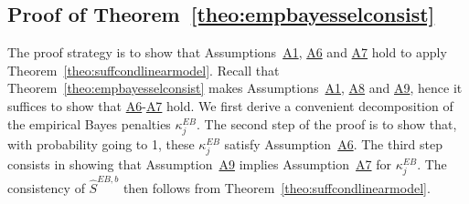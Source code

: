 \documentclass[bj,authoryear]{imsart}
\theoremstyle{plain}
\begin{document}
\subsection{Proof of Theorem~\ref{theo:empbayesselconsist}} The proof strategy is to show that Assumptions~\hyperlink{lab:A1}{A1}, \hyperlink{lab:A6}{A6} and \hyperlink{lab:A7}{A7} hold to apply Theorem~\ref{theo:suffcondlinearmodel}. Recall that Theorem~\ref{theo:empbayesselconsist} makes Assumptions~\hyperlink{lab:A1}{A1}, \hyperlink{lab:A8}{A8} and \hyperlink{lab:A9}{A9}, hence it suffices to show that \hyperlink{lab:A6}{A6}-\hyperlink{lab:A7}{A7} hold.
We first derive a convenient decomposition of the empirical Bayes penalties $\kappa^{EB}_j$. The second step of the proof is to show that, with probability going to 1, these $\kappa^{EB}_j$ satisfy Assumption~\hyperlink{lab:A6}{A6}. The third step consists in showing that Assumption~\hyperlink{lab:A9}{A9} implies Assumption~\hyperlink{lab:A7}{A7} for $\kappa^{EB}_j$. The consistency of $\hat S^{EB,b}$ then follows from Theorem~\ref{theo:suffcondlinearmodel}.
\end{document}
